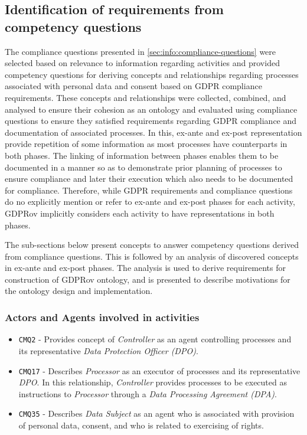 \subsection{Identification of requirements from competency questions}\label{sec:gdprov:cq}
The compliance questions presented in \autoref{sec:info:compliance-questions} were selected based on relevance to information regarding activities and provided competency questions for deriving concepts and relationships regarding processes associated with personal data and consent based on GDPR compliance requirements. 
These concepts and relationships were collected, combined, and analysed to ensure their cohesion as an ontology and evaluated using compliance questions to ensure they satisfied requirements regarding GDPR compliance and documentation of associated processes.
In this, ex-ante and ex-post representation provide repetition of some information as most processes have counterparts in both phases. The linking of information between phases enables them to be documented in a manner so as to demonstrate prior planning of processes to ensure compliance and later their execution which also needs to be documented for compliance.
Therefore, while GDPR requirements and compliance questions do no explicitly mention or refer to ex-ante and ex-post phases for each activity, GDPRov implicitly considers each activity to have representations in both phases.

The sub-sections below present concepts to answer competency questions derived from compliance questions. 
This is followed by an analysis of discovered concepts in ex-ante and ex-post phases.
The analysis is used to derive requirements for construction of GDPRov ontology, and is presented to describe motivations for the ontology design and implementation.

\subsubsection{Actors and Agents involved in activities}
\begin{itemize} 
    \item \texttt{CMQ2} - Provides concept of \textit{Controller} as an agent controlling processes and its representative \textit{Data Protection Officer (DPO)}.
    \item \texttt{CMQ17} - Describes \textit{Processor} as an executor of processes and its representative \textit{DPO}. In this relationship, \textit{Controller} provides processes to be executed as instructions to \textit{Processor} through a \textit{Data Processing Agreement (DPA)}.
    \item \texttt{CMQ35} - Describes \textit{Data Subject} as an agent who is associated with provision of personal data, consent, and who is related to exercising of rights.
\end{itemize}


